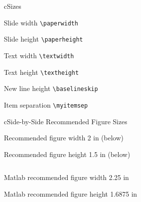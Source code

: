 \begin{myslidefragile}{c}{Sizes}

Slide width \lstinline{\paperwidth}
\def\x{\paperwidth}
\printlength{\x}
\printlength{\x}
\printlength{\x}

Slide height \lstinline{\paperheight}
\def\x{\paperheight}
\printlength{\x}
\printlength{\x}
\printlength{\x}

Text width \lstinline{\textwidth}
\def\x{\textwidth}
\printlength{\x}
\printlength{\x}
\printlength{\x}

Text height \lstinline{\textheight}
\def\x{\textheight}
\printlength{\x}
\printlength{\x}
\printlength{\x}

New line height
\lstinline{\baselineskip}
\def\x{\baselineskip}
\printlength{\x}
\printlength{\x}
\printlength{\x}

Item separation
\lstinline{\myitemsep}
\def\x{\myitemsep}
\printlength{\x}
\printlength{\x}
\printlength{\x}

\end{myslidefragile}

\begin{myslide}{c}{Side-by-Side Recommended Figure Sizes}

Recommended figure width 2 in (below)

Recommended figure height 1.5 in (below)

\begin{columns}



\end{columns}

\vspace{\baselineskip}

Matlab recommended figure width 2.25 in

Matlab recommended figure height 1.6875 in

\end{myslide}